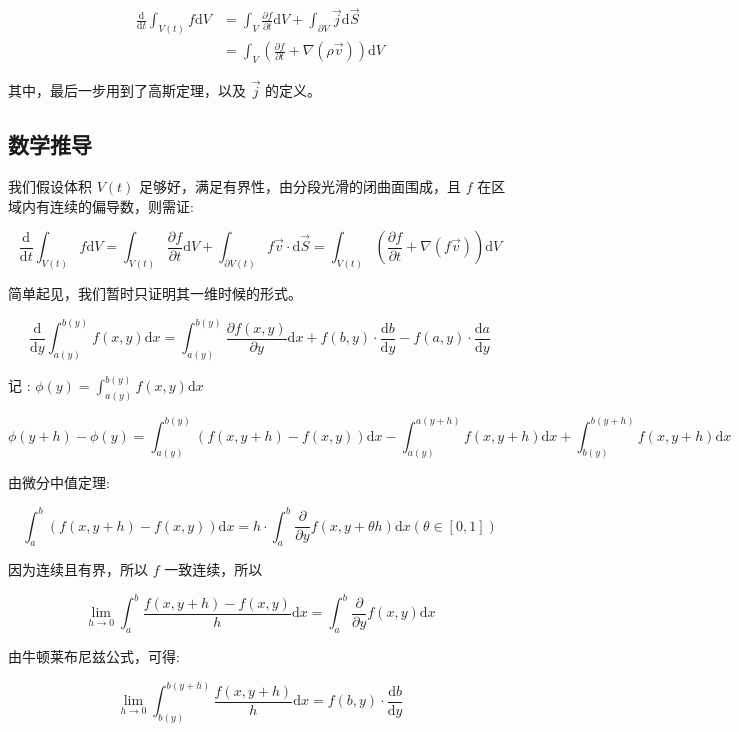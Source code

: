 \documentclass[fontset=windows]{article}
\begin{document}
$$
\begin{aligned}
    \frac{\mathrm{d}}{\mathrm{d}t} \int_{V(t)} f \mathrm{d}V
        &= \int_V \frac{\partial f}{\partial t} \mathrm{d}V +
            \int_{\partial V} \vec{j} \mathrm{d} \vec{S}      \\
        &= \int_V (\frac{\partial f}{\partial t} + \nabla (\rho \vec{v})) \mathrm{d}V
\end{aligned}
$$

其中，最后一步用到了高斯定理，以及 $\vec{j}$ 的定义。

\subsection{数学推导}

我们假设体积 $V(t)$ 足够好，满足有界性，由分段光滑的闭曲面围成，且 $f$ 在区域内有连续的偏导数，则需证:

$$
\frac{\mathrm{d}}{\mathrm{d}t} \int_{V(t)} f \mathrm{d}V
= \int_{V(t)} \frac{\partial f}{\partial t} \mathrm{d}V +
  \int_{\partial V(t)} {f \vec{v} \cdot \mathrm{d}\vec{S}}
= \int_{V(t)} (\frac{\partial f}{\partial t} + \nabla (f \vec{v})) \mathrm{d}V
$$

简单起见，我们暂时只证明其一维时候的形式。

$$
\frac{\mathrm{d}}{\mathrm{d}y} \int_{a(y)}^{b(y)}f(x,y) \mathrm{d}x = 
\int_{a(y)}^{b(y)}\frac{\partial f(x,y)}{\partial y} \mathrm{d}x
+ f(b,y) \cdot \frac{\mathrm{d}b}{\mathrm{d}y}
- f(a,y) \cdot \frac{\mathrm{d}a}{\mathrm{d}y}
$$

记 : $ \phi(y) = \int_{a(y)}^{b(y)}f(x,y) \mathrm{d}x $

$$
\phi(y + h) - \phi(y) = \int_{a(y)}^{b(y)}(f(x,y + h) - f(x,y))\mathrm{d}x
                        - \int_{a(y)}^{a(y + h)}f(x,y + h)\mathrm{d}x
                        + \int_{b(y)}^{b(y + h)}f(x,y + h)\mathrm{d}x
$$

由微分中值定理:

$$
\int_{a}^{b}(f(x,y + h) - f(x,y))\mathrm{d}x 
    = h \cdot \int_{a}^{b} \frac{\partial}{\partial y}f(x,y + \theta h) \mathrm{d}x (\theta \in [0,1])
$$

因为连续且有界，所以 $f$ 一致连续，所以

$$
\lim_{h \rightarrow 0} \int_{a}^{b}\frac{f(x,y + h) - f(x,y)}{h}\mathrm{d}x 
    = \int_{a}^{b} \frac{\partial}{\partial y}f(x,y) \mathrm{d}x
$$

由牛顿莱布尼兹公式，可得:

$$
\lim_{h \rightarrow 0} \int_{b(y)}^{b(y + h)} \frac{f(x,y + h)}{h}\mathrm{d}x 
    = f(b,y) \cdot \frac{\mathrm{d}b}{\mathrm{d}y}
$$
\end{document}
